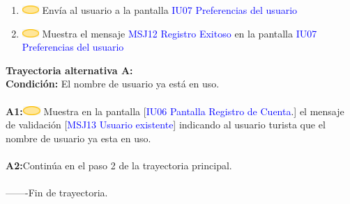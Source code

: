 \begin{enumerate}
                       \item \includegraphics[width=0.0500\textwidth]{Figuras/sistema.png} Envía al usuario a la pantalla \textcolor{blue}{IU07 Preferencias del usuario}
                     
                       \item \includegraphics[width=0.0500\textwidth]{Figuras/sistema.png} Muestra el mensaje \textcolor{blue}{MSJ12
Registro Exitoso} en la pantalla \textcolor{blue}{IU07 Preferencias del usuario}
                    \end{enumerate}
                    
                    \textbf{Trayectoria alternativa A:}\\
                        \textbf{Condición:} El nombre de usuario ya está en uso.\\\\
                        \textbf{A1:}\includegraphics[width=0.0500\textwidth]{Figuras/sistema.png} Muestra en la pantalla [\textcolor{blue}{IU06 Pantalla Registro de Cuenta}.] el mensaje de validación [\textcolor{blue}{MSJ13 Usuario existente}] indicando al usuario turista que el nombre de usuario ya esta en uso. \\\\
                        
                        \textbf{A2:}Continúa en el paso 2 de la trayectoria principal. \\\\
       -------Fin de trayectoria. \\\\


